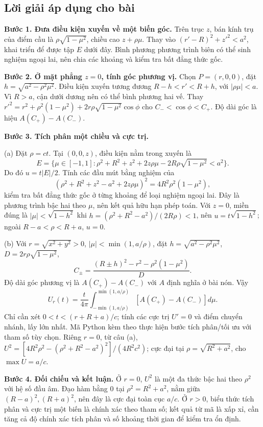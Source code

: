 \documentclass[10pt,a4paper]{article}
\begin{document}
\subsection*{Lời giải áp dụng cho bài}
\textbf{Bước 1. Đưa điều kiện xuyến về một biến góc.} Trên trục $z$, bán kính trụ của điểm cầu là $\rho\sqrt{1-\mu^2}$, chiều cao $z+\rho\mu$. Thay vào $(r'-R)^2+z'^2<a^2$, khai triển để được tập $E$ dưới đây. Bình phương phương trình biên có thể sinh nghiệm ngoại lai, nên chia các khoảng và kiểm tra bất đẳng thức gốc.

\textbf{Bước 2. Ở mặt phẳng $z=0$, tính góc phương vị.} Chọn $P=(r,0,0)$, đặt $h=\sqrt{a^2-\rho^2\mu^2}$. Điều kiện xuyến tương đương $R-h<r'<R+h$, với $|\rho\mu|<a$. Vì $R>a$, cận dưới dương nên có thể bình phương hai vế. Thay $r'^2=r^2+\rho^2(1-\mu^2)+2r\rho\sqrt{1-\mu^2}\cos\phi$ cho $C_-<\cos\phi<C_+$. Độ dài góc là hiệu $A(C_+)-A(C_-)$.

\textbf{Bước 3. Tích phân một chiều và cực trị.}

(a) Đặt $\rho=ct$. Tại $(0,0,z)$, điều kiện nằm trong xuyến là
\[E=\{\mu\in[-1,1]:\rho^2+R^2+z^2+2z\rho\mu-2R\rho\sqrt{1-\mu^2}<a^2\}.\]
Do đó $u=t|E|/2$. Tính các đầu mút bằng nghiệm của
\[(\rho^2+R^2+z^2-a^2+2z\rho\mu)^2=4R^2\rho^2(1-\mu^2),\]
kiểm tra bất đẳng thức gốc ở từng khoảng để loại nghiệm ngoại lai. Đây là phương trình bậc hai theo $\mu$, nên kết quả hữu hạn phép toán. Với $z=0$, miền đúng là $|\mu|<\sqrt{1-h^2}$ khi $h=(\rho^2+R^2-a^2)/(2R\rho)<1$, nên $u=t\sqrt{1-h^2}$; ngoài $R-a<\rho<R+a$, $u=0$.

(b) Với $r=\sqrt{x^2+y^2}>0$, $|\mu|<\min(1,a/\rho)$, đặt $h=\sqrt{a^2-\rho^2\mu^2}$, $D=2r\rho\sqrt{1-\mu^2}$,
\[C_\pm=\frac{(R\pm h)^2-r^2-\rho^2(1-\mu^2)}D.\]
Độ dài góc phương vị là $A(C_+)-A(C_-)$ với $A$ định nghĩa ở bài nón. Vậy
\[U_r(t)=\frac t{4\pi}\int_{-\min(1,a/\rho)}^{\min(1,a/\rho)}[A(C_+)-A(C_-)]d\mu.\]
Chỉ cần xét $0<t<(r+R+a)/c$; tính các cực trị $U'=0$ và điểm chuyển nhánh, lấy lớn nhất. Mã Python kèm theo thực hiện bước tích phân/tối ưu với tham số tùy chọn. Riêng $r=0$, từ câu (a), $U^2=[4R^2\rho^2-(\rho^2+R^2-a^2)^2]/(4R^2c^2)$; cực đại tại $\rho=\sqrt{R^2+a^2}$, cho $\max U=a/c$.

\textbf{Bước 4. Đối chiếu và kết luận.} Ở $r=0$, $U^2$ là một đa thức bậc hai theo $\rho^2$ với hệ số đầu âm. Đạo hàm bằng $0$ tại $\rho^2=R^2+a^2$, nằm giữa $(R-a)^2,(R+a)^2$, nên đây là cực đại toàn cục $a/c$. Ở $r>0$, biểu thức tích phân và cực trị một biến là chính xác theo tham số; kết quả từ mã là xấp xỉ, cần tăng cả độ chính xác tích phân và số khoảng thời gian để kiểm tra ổn định.
\end{document}
